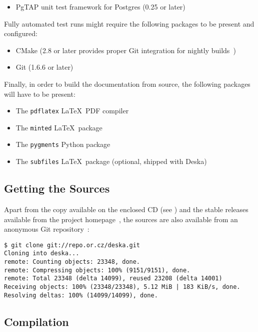 \documentclass[deska]{subfiles}
\begin{document}
\begin{itemize}
    \item PgTAP unit test framework for Postgres (0.25 or later)~\cite{pgtap}
\end{itemize}

Fully automated test runs might require the following packages to be present and configured:

\begin{itemize}
    \item CMake (2.8 or later provides proper Git integration for nightly builds~\cite{deska-dashboard})
    \item Git (1.6.6 or later)
\end{itemize}

Finally, in order to build the documentation from source, the following packages will have to be present:

\begin{itemize}
    \item The {\tt pdflatex} \LaTeX~PDF compiler
    \item The {\tt minted} \LaTeX~package~\cite{latex-minted}
    \item The {\tt pygments} Python package~\cite{pygments}
    \item The {\tt subfiles} \LaTeX~package (optional, shipped with Deska)~\cite{latex-subfiles}
\end{itemize}

\subsection{Getting the Sources}

Apart from the copy available on the enclosed CD (see ) and the stable releases available from
the project homepage~\cite{deska-project}, the sources are also available from an anonymous Git
repository~\cite{deska-git}:

\begin{verbatim}
$ git clone git://repo.or.cz/deska.git
Cloning into deska...
remote: Counting objects: 23348, done.
remote: Compressing objects: 100% (9151/9151), done.
remote: Total 23348 (delta 14099), reused 23208 (delta 14001)
Receiving objects: 100% (23348/23348), 5.12 MiB | 183 KiB/s, done.
Resolving deltas: 100% (14099/14099), done.
\end{verbatim}

\subsection{Compilation}
\end{document}
